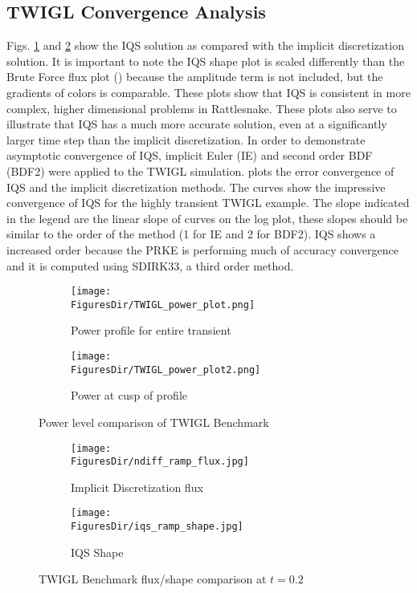 \subsection{TWIGL Convergence Analysis}


Figs. \ref{fig:TWIGL_power} and \ref{fig:TWIGL_plots} show the IQS  solution as compared with the implicit discretization solution.  It is important to note the IQS shape plot is scaled differently than the Brute Force flux plot () because the amplitude term is not included, but the gradients of colors is comparable. These plots show that IQS is consistent in more complex, higher dimensional problems in Rattlesnake. These plots also serve to illustrate that IQS has a much more accurate solution, even at a significantly larger time step than the implicit discretization. In order to demonstrate asymptotic convergence of IQS, implicit Euler (IE) and second order BDF (BDF2) were applied to the TWIGL simulation.  plots the error convergence of IQS and the implicit discretization methods.  The curves show the impressive convergence of IQS for the highly transient TWIGL example. The slope indicated in the legend are the linear slope of curves on the log plot, these slopes should be similar to the order of the method (1 for IE and 2 for BDF2).  IQS shows a increased order because the PRKE is performing much of accuracy convergence and it is computed using SDIRK33, a third order method.

\begin{figure}[!htbp]
\centering
\begin{subfigure}[!htbp]{0.49\textwidth}
\texttt{[image: \\FiguresDir/TWIGL\_power\_plot.png]}
\caption{Power profile for entire transient}
\end{subfigure}
\begin{subfigure}[!htbp]{0.49\textwidth}
\texttt{[image: \\FiguresDir/TWIGL\_power\_plot2.png]}
\caption{Power at cusp of profile}
\end{subfigure}
\caption{Power level comparison of TWIGL Benchmark}
\label{fig:TWIGL_power}
\end{figure}

\begin{figure}[!htbp]
\begin{center}
\begin{subfigure}[!htbp]{0.4\textwidth}
\texttt{[image: \\FiguresDir/ndiff\_ramp\_flux.jpg]}
\caption{Implicit Discretization flux}
\end{subfigure}
\quad
\begin{subfigure}[!htbp]{0.4\textwidth}
\texttt{[image: \\FiguresDir/iqs\_ramp\_shape.jpg]}
\caption{IQS Shape}
\end{subfigure}
\caption{TWIGL Benchmark flux/shape comparison at $t=0.2$}
\label{fig:TWIGL_plots}
\end{center}
\end{figure}

